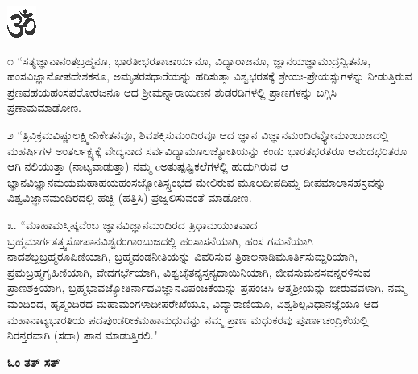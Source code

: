 
\begin{center}
{\includegraphics[scale=1.5]{om.eps}}
\end{center}

೧ ``ಸತ್ಯಜ್ಞಾನಾನಂತಬ್ರಹ್ಮನೂ, ಭಾರತೀಭರತಾಚಾರ್ಯನೂ, ವಿದ್ಯಾರಾಜನೂ, ಜ್ಞಾನಯಜ್ಞಾಮುದ್ರನ್ವಿತನೂ, ಹಂಸವಿಜ್ಞಾನೋಪದೇಶಕನೂ, ಅಮೃತರಸಧಾರೆಯನ್ನು ಹರಿಸುತ್ತಾ ವಿಶ್ವಭರತಕ್ಕೆ  ಶ್ರೇಯಃ-ಪ್ರೇಯಸ್ಸುಗಳನ್ನು ನೀಡುತ್ತಿರುವ ಪ್ರಣವಹಯಹಂಸಪರೋರಜನೂ ಆದ ಶ್ರೀಮನ್ನಾರಾಯಣನ ಶುಡರಡಿಗಳಲ್ಲಿ ಪ್ರಾಣಗಳನ್ನು ಬಗ್ಗಿಸಿ ಪ್ರಣಾಮಮಾಡೋಣ.

೨ ``ತ್ರಿವಿಕ್ರಮವಿಷ್ಣುಲಕ್ಷ್ಮೀನಿಕೇತನವೂ, ಶಿವಶಕ್ತಿಸುಮಂದಿರವೂ ಆದ ಜ್ಞಾನ ವಿಜ್ಞಾನಮಂದಿರವ್ಯೋಮಾಂಬುಜದಲ್ಲಿ ಮಹರ್ಷಿಗಳ ಅಂತರ್ಲಕ್ಪ್ಯಕ್ಕೆ ವೇದ್ಯನಾದ ಸರ್ವವಿದ್ಯಾಮೂಲಜ್ಯೋತಿಯನ್ನು ಕಂಡು ಭಾರತಭರತರೂ ಆನಂದಭರಿತರೂ ಆಗಿ ನಲಿಯುತ್ತಾ (ನಾಟ್ಯವಾಡುತ್ತಾ) ನಮ್ಮ cಅತುಷ್ಪಷ್ಟಿಕಲೆಗಳಲ್ಲಿ ಹುದುಗಿರುವ ಆ ಜ್ಞಾನವಿಜ್ಞಾನಮಯಮಹಾಹಯಹಂಸಜ್ಯೋತಿಸ್ಸ್ತಂಭದ ಮೇಲಿರುವ ಮೂಲದೀಪದಿಮ್ದ ದೀಪಮಾಲಾಸಹಸ್ರವನ್ನು ವಿಶ್ವವಿಜ್ಞಾನಮಂದಿರದಲ್ಲಿ ಹಚ್ಚಿ (ಹತ್ತಿಸಿ) ಪ್ರಜ್ವಲಿಸುವಂತೆ ಮಾಡೋಣ.

೩. ``ಮಾಹಾಮಸ್ತಿಷ್ಕವೆಂಬ ಜ್ಞಾನವಿಜ್ಞಾನಮಂದಿರದ ತ್ರಿಧಾಮಯುತವಾದ ಬ್ರಹ್ಮಮಾರ್ಗತತ್ತ್ವಸೋಪಾನವಿಶ್ವರಂಗಾಂಬುಜದಲ್ಲಿ ಹಂಸಾಸನೆಯಾಗಿ, ಹಂಸ ಗಮನೆಯಾಗಿ ನಾದಶಬ್ದಬ್ರಹ್ಮರೂಪಿಣಿಯಾಗಿ, ಬ್ರಹ್ಮದಂಡನೀತಿಯನ್ನು ವಿವರಿಸುವ ತ್ರಿಕಾಲನಾಡಿಮೂರ್ತಿಸುಮ್ದರಿಯಾಗಿ, ಪ್ರಮಬ್ರಹ್ಮಗೃಹಿಣಿಯಾಗಿ, ವೇದಗರ್ಭೆಯಾಗಿ, ವಿಶ್ವಚೈತನ್ಯಸ್ತನ್ಯದಾಯಿನಿಯಾಗಿ, ಜೀವಸುಮನಸವನ್ನರಳಿಸುವ ಪ್ರಾಣಶಕ್ತಿಯಾಗಿ, ಬ್ರಹ್ಮಭಾವಜ್ಯೋತಿರ್ನಾದವಿಜ್ಞಾನವಿಪಂಚಿಕೆಯನ್ನು ಪ್ರಪಂಚಿಸಿ ಆತ್ಮಶ್ರೀಯನ್ನು ಬೀರುವವಳಾಗಿ, ನಮ್ಮ ಮಂದಿರದ, ಹೃತ್ಮಂದಿರದ ಮಹಾಮಂಗಳಾದೀಪರೇಖೆಯೂ, ವಿದ್ಯಾರಾಣಿಯೂ, ವಿಶ್ವಶಿಲ್ಪವಿಧಾನಜ್ಞೆಯೂ ಆದ ಮಹಾನಾಟ್ಯಭಾರತಿಯ ಪದಪುಂಡರೀಕಮಹಾಮಧುವನ್ನು ನಮ್ಮ ಪ್ರಾಣ ಮಧುಕರವು ಪೂರ್ಣಚಂದ್ರಿಕೆಯಲ್ಲಿ ನಿರನ್ತರವಾಗಿ (ಸದಾ) ಪಾನ ಮಾಡುತ್ತಿರಲಿ."

\vskip 20pt
\centerline{{\bf ಓಂ ತತ್ ಸತ್}}
